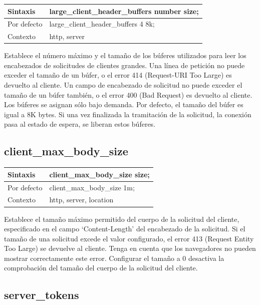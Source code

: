 \begin{table}[H]
\begin{tabular}{|l|l|}
\hline
Sintaxis      & large\_client\_header\_buffers number size; \\ \hline
Por defecto   & large\_client\_header\_buffers 4 8k;     \\ \hline
Contexto      & http, server     \\ \hline
\end{tabular}
\end{table}

Establece el número máximo y el tamaño de los búferes utilizados para leer los encabezados de solicitudes de clientes grandes. Una línea de petición no puede exceder el tamaño de un búfer, o el error 414 (Request-URI Too Large) es devuelto al cliente. Un campo de encabezado de solicitud no puede exceder el tamaño de un búfer también, o el error 400 (Bad Request) es devuelto al cliente. Los búferes se asignan sólo bajo demanda. Por defecto, el tamaño del búfer es igual a 8K bytes. Si una vez finalizada la tramitación de la solicitud, la conexión pasa al estado de espera, se liberan estos búferes.

\subsection{client\_max\_body\_size}

\begin{table}[H]
\begin{tabular}{|l|l|}
\hline
Sintaxis      & client\_max\_body\_size size; \\ \hline
Por defecto   & client\_max\_body\_size 1m;     \\ \hline
Contexto      & http, server, location     \\ \hline
\end{tabular}
\end{table}

Establece el tamaño máximo permitido del cuerpo de la solicitud del cliente, especificado en el campo `Content-Length' del encabezado de la solicitud. Si el tamaño de una solicitud excede el valor configurado, el error 413 (Request Entity Too Large) se devuelve al cliente. Tenga en cuenta que los navegadores no pueden mostrar correctamente este error. Configurar el tamaño a 0 desactiva la comprobación del tamaño del cuerpo de la solicitud del cliente.

\subsection{server\_tokens}

